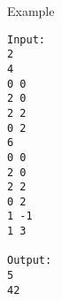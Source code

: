 Example
\begin{verbatim}
Input:
2
4
0 0
2 0
2 2
0 2
6
0 0
2 0
2 2
0 2
1 -1
1 3

Output:
5
42
\end{verbatim}